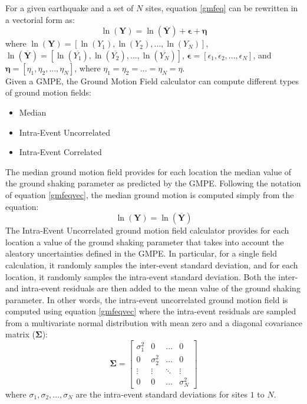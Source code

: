 For a given earthquake and a set of $N$ sites, equation \ref{gmfeq} can 
be rewritten in a vectorial form as:
\begin{equation}
\ln (\bm{Y}) = \ln (\overline{\bm{Y}})+\bm{\epsilon}+\bm{\eta} 
\label{gmfeqvec}
\end{equation}
where ${\ln (\bm{Y})}=[\ln (Y_{1}), \ln (Y_{2}),...,\ln (Y_{N})]$, 
$\ln (\overline{\bm{Y}})=[\ln (\overline{Y_{1}}), 
\ln (\overline{Y_{2}}),...,\ln (\overline{Y_{N}})]$, $\bm{\epsilon}=[\epsilon_{1},\epsilon_{2},...,\epsilon_{N}]$, and $\bm{\eta}=[\eta_{1},\eta_{2},...,\eta_{N}]$, where $\eta_{1}=\eta_{2}=...=\eta_{N}=\eta$.\\
Given a GMPE, the Ground Motion Field calculator can compute different types 
of ground motion fields:
\begin{itemize}
\item Median
\item Intra-Event Uncorrelated
\item Intra-Event Correlated
\end{itemize}
The median ground motion field provides for each location the median value of 
the ground shaking parameter as predicted by the GMPE. Following the notation 
of equation \ref{gmfeqvec}, the median ground motion is computed simply from 
the equation:
\begin{equation}
\ln (\bm{Y}) = \ln (\overline{\bm{Y}})
\end{equation}
The Intra-Event Uncorrelated ground motion field calculator provides for each 
location a value of the ground shaking parameter that takes into account 
the aleatory uncertainties defined in the GMPE. In particular, for a single 
field calculation, it randomly samples the inter-event standard deviation, 
and for each location, it randomly samples the intra-event standard deviation.
%
Both the inter- and intra-event residuals are then added to the mean value of 
the ground shaking parameter. In other words, the intra-event uncorrelated 
ground motion field is computed using equation \ref{gmfeqvec} where the 
intra-event residuals are sampled from a multivariate normal distribution
with mean zero and a diagonal covariance matrix ($\bm{\Sigma}$):
\begin{equation}
\bm{\Sigma}=
\begin{bmatrix}
\sigma^{2}_{1} &  0  & \ldots & 0\\
0  &  \sigma^{2}_{2} & \ldots & 0\\
\vdots & \vdots & \ddots & \vdots\\
0  &   0       &\ldots & \sigma^{2}_{N}
\end{bmatrix}
\end{equation}
where $\sigma_{1}, \sigma_{2},...,\sigma_{N}$ are the intra-event standard 
deviations for sites $1$ to $N$.

